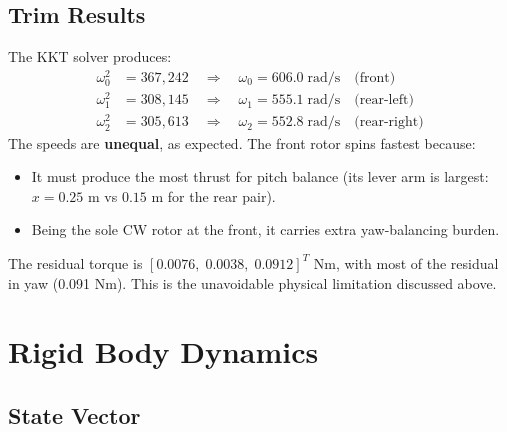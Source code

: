 \documentclass[12pt, a4paper]{article}
\begin{document}
\subsection{Trim Results}

The KKT solver produces:
\begin{align}
    \omega_0^2 &= 367{,}242 \quad \Rightarrow \quad \omega_0 = 606.0 \;\text{rad/s} \quad \text{(front)} \\
    \omega_1^2 &= 308{,}145 \quad \Rightarrow \quad \omega_1 = 555.1 \;\text{rad/s} \quad \text{(rear-left)} \\
    \omega_2^2 &= 305{,}613 \quad \Rightarrow \quad \omega_2 = 552.8 \;\text{rad/s} \quad \text{(rear-right)}
\end{align}
The speeds are \textbf{unequal}, as expected.  The front rotor spins fastest because:
\begin{itemize}
    \item It must produce the most thrust for pitch balance (its lever arm is largest: $x = 0.25$ m vs $0.15$ m for the rear pair).
    \item Being the sole CW rotor at the front, it carries extra yaw-balancing burden.
\end{itemize}

The residual torque is $[0.0076, \; 0.0038, \; 0.0912]^T$ Nm, with most of the residual in yaw (0.091 Nm).  This is the unavoidable physical limitation discussed above.

\section{Rigid Body Dynamics}
\label{sec:dynamics}

\subsection{State Vector}
\end{document}
